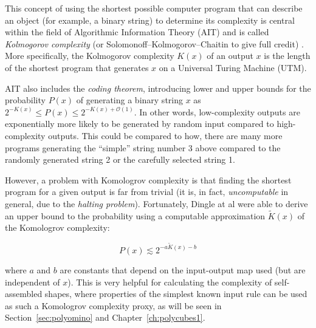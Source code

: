 This concept of using the shortest possible computer program that can describe an object (for example, a binary string) to determine its complexity is central within the field of Algorithmic Information Theory (AIT) and is called \emph{Kolmogorov complexity} (or Solomonoff–Kolmogorov–Chaitin to give full credit) \cite{LiMing2019AitK}. More specifically, the Kolmogorov complexity \(K(x)\) of an output \(x\) is the length of the shortest program that generates \(x\) on a Universal Turing Machine (UTM).

AIT also includes the \emph{coding theorem}, introducing lower and upper bounds for the probability \(P(x)\) of generating a binary string \(x\) as \(2^{-K(x)} \le P(x) \le 2^{-K(x) + \mathcal{O} (1)}\). In other words, low-complexity outputs are exponentially more likely to be generated by random input compared to high-complexity outputs. This could be compared to how, there are many more programs generating the ``simple'' string number 3 above compared to the randomly generated string 2 or the carefully selected string 1.

However, a problem with Komologrov complexity is that finding the shortest program for a given output is far from trivial (it is, in fact, \emph{uncomputable} in general, due to the \emph{halting problem}). Fortunately, Dingle at al \cite{dingle2018input} were able to derive an upper bound to the probability using a computable approximation \(\widetilde{K}(x)\) of the Komologrov complexity:

\[
  P(x) \lesssim 2^{-a\widetilde{K}(x) -b}
\]

where \(a\) and \(b\) are constants that depend on the input-output map used (but are independent of \(x\)). This is very helpful for calculating the complexity of self-assembled shapes, where properties of the simplest known input rule can be used as such a Komologrov complexity proxy, as  will be seen in Section~\ref{sec:polyomino} and Chapter~\ref{ch:polycubes1}.




